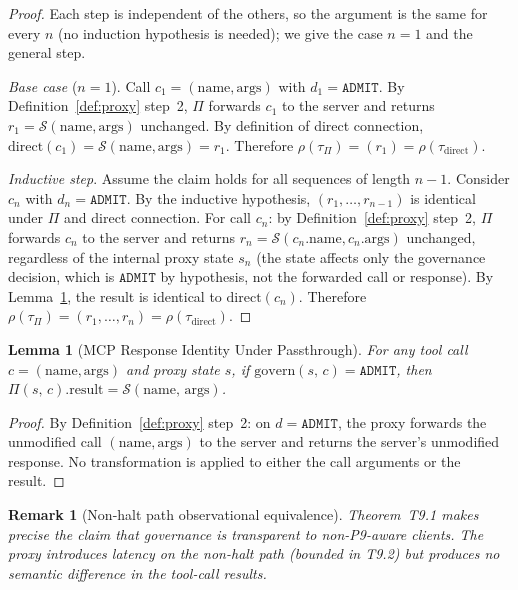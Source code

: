 \documentclass[11pt]{article}
\newtheorem{lemma}[theorem]{Lemma}
\newtheorem{remark}{Remark}[section]
\newcommand{\ADMIT}{\texttt{ADMIT}}
\newcommand{\Proxy}{\Pi}
\begin{document}
\begin{proof}
Each step is independent of the others, so the argument is the same for
every $n$ (no induction hypothesis is needed); we give the case $n=1$
and the general step.

\emph{Base case} ($n=1$).
Call $c_1 = (\text{name}, \text{args})$ with $d_1 = \ADMIT$.
By Definition~\ref{def:proxy} step~2, $\Proxy$ forwards $c_1$ to the
server and returns $r_1 = \mathcal{S}(\text{name}, \text{args})$
unchanged. By definition of direct connection,
$\mathrm{direct}(c_1) = \mathcal{S}(\text{name}, \text{args}) = r_1$.
Therefore $\rho(\tau_\Proxy) = (r_1) = \rho(\tau_\text{direct})$.

\emph{Inductive step}.
Assume the claim holds for all sequences of length $n-1$.
Consider $c_n$ with $d_n = \ADMIT$.
By the inductive hypothesis, $(r_1, \ldots, r_{n-1})$ is identical
under $\Proxy$ and direct connection.
For call $c_n$: by Definition~\ref{def:proxy} step~2,
$\Proxy$ forwards $c_n$ to the server and returns
$r_n = \mathcal{S}(c_n.\text{name}, c_n.\text{args})$ unchanged,
regardless of the internal proxy state $s_n$ (the state affects only
the governance decision, which is $\ADMIT$ by hypothesis, not the
forwarded call or response).
By Lemma~\ref{lem:l911}, the result is identical to $\mathrm{direct}(c_n)$.
Therefore $\rho(\tau_\Proxy) = (r_1, \ldots, r_n) = \rho(\tau_\text{direct})$.
\end{proof}

\begin{lemma}[MCP Response Identity Under Passthrough]
\label{lem:l911}
For any tool call $c = (\text{name}, \text{args})$ and proxy state $s$,
if $\mathrm{govern}(s,\,c) = \ADMIT$, then
$\Proxy(s,\,c).\text{result} = \mathcal{S}(\text{name},\,\text{args})$.
\end{lemma}

\begin{proof}
By Definition~\ref{def:proxy} step~2: on $d = \ADMIT$, the proxy
forwards the unmodified call $(\text{name}, \text{args})$ to the
server and returns the server's unmodified response.
No transformation is applied to either the call arguments or the result.
\end{proof}

\begin{remark}[Non-halt path observational equivalence]
Theorem~T9.1 makes precise the claim that governance is \emph{transparent}
to non-P9-aware clients. The proxy introduces latency on the non-halt
path (bounded in T9.2) but produces no semantic difference in the
tool-call results.
\end{remark}
\end{document}
